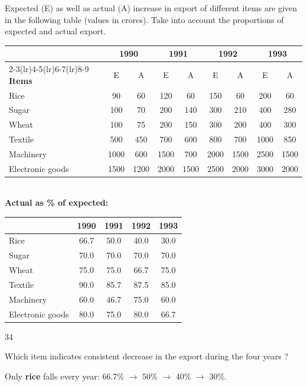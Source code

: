 \begin{context}
Expected (E) as well as actual (A) increase in export of different items are given in the following table (values in crores). Take into account the proportions of expected and actual export.
\begin{center}\small
\begin{tabular}{l*{8}{c}}\toprule
& \multicolumn{2}{c}{1990} & \multicolumn{2}{c}{1991} & \multicolumn{2}{c}{1992} & \multicolumn{2}{c}{1993}\\\cmidrule(lr){2-3}\cmidrule(lr){4-5}\cmidrule(lr){6-7}\cmidrule(lr){8-9}
\textbf{Items} & E & A & E & A & E & A & E & A\\\midrule
Rice & 90 & 60 & 120 & 60 & 150 & 60 & 200 & 60\\ Sugar & 100 & 70 & 200 & 140 & 300 & 210 & 400 & 280\\ Wheat & 100 & 75 & 200 & 150 & 300 & 200 & 400 & 300\\ Textile & 500 & 450 & 700 & 600 & 800 & 700 & 1000 & 850\\ Machinery & 1000 & 600 & 1500 & 700 & 2000 & 1500 & 2500 & 1500\\ Electronic goods & 1500 & 1200 & 2000 & 1500 & 2500 & 2000 & 3000 & 2000\\\bottomrule
\end{tabular}\\[4pt]
\textbf{Actual as \% of expected:}\\[2pt]
\begin{tabular}{lcccc}\toprule & 1990 & 1991 & 1992 & 1993\\\midrule
Rice & 66.7 & 50.0 & 40.0 & 30.0\\ Sugar & 70.0 & 70.0 & 70.0 & 70.0\\ Wheat & 75.0 & 75.0 & 66.7 & 75.0\\ Textile & 90.0 & 85.7 & 87.5 & 85.0\\ Machinery & 60.0 & 46.7 & 75.0 & 60.0\\ Electronic goods & 80.0 & 75.0 & 80.0 & 66.7\\\bottomrule
\end{tabular}
\end{center}
\end{context}
\begin{question}{34}
{Which item indicates consistent decrease in the export during the four years ?\par}
\begin{explain}
Only \textbf{rice} falls every year: 66.7\% $\rightarrow$ 50\% $\rightarrow$ 40\% $\rightarrow$ 30\%.
\end{explain}
\end{question}

